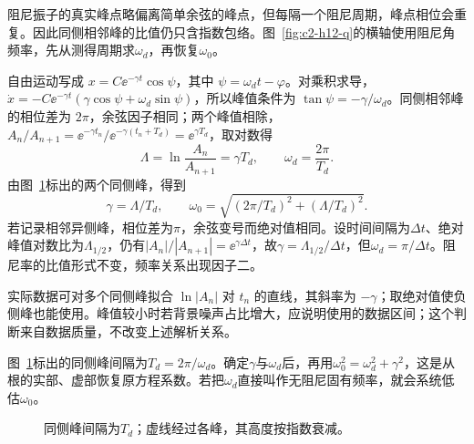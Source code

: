 \begin{solution}
阻尼振子的真实峰点略偏离简单余弦的峰点，但每隔一个阻尼周期，峰点相位会重复。因此同侧相邻峰的比值仍只含指数包络。图~\ref{fig:c2-h12-q}的横轴使用阻尼角频率，先从测得周期求$\omega_d$，再恢复$\omega_0$。


自由运动写成 $x=C\ee^{-\gamma t}\cos\psi$，其中 $\psi=\omega_dt-\varphi$。对乘积求导，$\dot x=-C\ee^{-\gamma t}(\gamma\cos\psi+\omega_d\sin\psi)$，所以峰值条件为 $\tan\psi=-\gamma/\omega_d$。同侧相邻峰的相位差为 $2\pi$，余弦因子相同；两个峰值相除，$A_n/A_{n+1}=\ee^{-\gamma t_n}/\ee^{-\gamma(t_n+T_d)}=\ee^{\gamma T_d}$，取对数得
\[\Lambda=\ln\frac{A_n}{A_{n+1}}=\gamma T_d,\qquad
\omega_d=\frac{2\pi}{T_d}.\]
由图~\ref{fig:c2-h12-s}标出的两个同侧峰，得到
\[\boxed{\gamma=\Lambda/T_d,\qquad
\omega_0=\sqrt{(2\pi/T_d)^2+(\Lambda/T_d)^2}}.\]
若记录相邻异侧峰，相位差为$\pi$，余弦变号而绝对值相同。设时间间隔为$\Delta t$、绝对峰值对数比为$\Lambda_{1/2}$，仍有$|A_n|/|A_{n+1}|=\ee^{\gamma\Delta t}$，故$\gamma=\Lambda_{1/2}/\Delta t$，但$\omega_d=\pi/\Delta t$。阻尼率的比值形式不变，频率关系出现因子二。

实际数据可对多个同侧峰拟合 $\ln|A_n|$ 对 $t_n$ 的直线，其斜率为 $-\gamma$；取绝对值使负侧峰也能使用。峰值较小时若背景噪声占比增大，应说明使用的数据区间；这个判断来自数据质量，不改变上述解析关系。


图~\ref{fig:c2-h12-s}标出的同侧峰间隔为$T_d=2\pi/\omega_d$。确定$\gamma$与$\omega_d$后，再用$\omega_0^2=\omega_d^2+\gamma^2$，这是从根的实部、虚部恢复原方程系数。若把$\omega_d$直接叫作无阻尼固有频率，就会系统低估$\omega_0$。

\begin{figure}[H]\centering
{}
\caption{同侧峰间隔为$T_d$；虚线经过各峰，其高度按指数衰减。}\label{fig:c2-h12-s}
\end{figure}
\end{solution}

